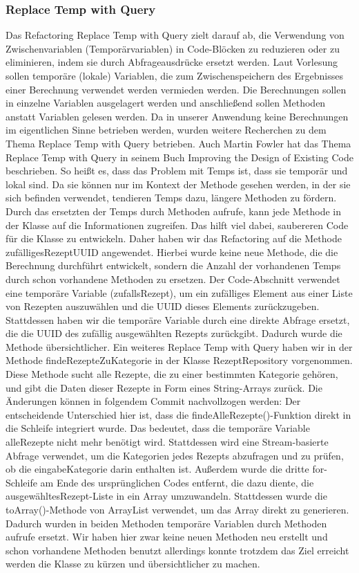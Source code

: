 \subsubsection{Replace Temp with Query}
Das Refactoring Replace Temp with Query zielt darauf ab, die Verwendung von Zwischenvariablen (Temporärvariablen) in Code-Blöcken zu reduzieren oder zu eliminieren, indem sie durch Abfrageausdrücke ersetzt werden. 
Laut Vorlesung sollen temporäre (lokale) Variablen, die zum Zwischenspeichern des Ergebnisses einer Berechnung verwendet werden vermieden werden. Die Berechnungen sollen in einzelne Variablen ausgelagert werden und anschließend sollen Methoden anstatt Variablen gelesen werden. 
Da in unserer Anwendung keine Berechnungen im eigentlichen Sinne betrieben werden, wurden weitere Recherchen zu dem Thema Replace Temp with Query betrieben. Auch Martin Fowler hat das Thema Replace Temp with Query in seinem Buch \glqq Improving the Design of Existing Code \grqq{} beschrieben. So heißt es, dass das Problem mit Temps ist, dass sie temporär und lokal sind. Da sie können nur im Kontext der Methode gesehen werden, in der sie sich befinden verwendet, tendieren Temps dazu, längere Methoden zu fördern.
Durch das ersetzten der Temps durch Methoden aufrufe, kann jede Methode in der Klasse auf die Informationen zugreifen. Das hilft
viel dabei, saubereren Code für die Klasse zu entwickeln.
Daher haben wir das Refactoring auf die Methode zufälligesRezeptUUID angewendet. Hierbei wurde keine neue Methode, die die Berechnung durchführt entwickelt, sondern die Anzahl der vorhandenen Temps durch schon vorhandene Methoden zu ersetzen. Der Code-Abschnitt verwendet eine temporäre Variable (zufallsRezept), um ein zufälliges Element aus einer Liste von Rezepten auszuwählen und die UUID dieses Elements zurückzugeben. Stattdessen haben wir die temporäre Variable durch eine direkte Abfrage ersetzt, die die UUID des zufällig ausgewählten Rezepts zurückgibt. Dadurch wurde die Methode übersichtlicher.
Ein weiteres Replace Temp with Query haben wir in der Methode findeRezepteZuKategorie in der Klasse RezeptRepository vorgenommen. Diese Methode sucht alle Rezepte, die zu einer bestimmten Kategorie gehören, und gibt die Daten dieser Rezepte in Form eines String-Arrays zurück. Die Änderungen können in folgendem Commit nachvollzogen werden: 
Der entscheidende Unterschied hier ist, dass die findeAlleRezepte()-Funktion direkt in die Schleife integriert wurde. Das bedeutet, dass die temporäre Variable alleRezepte nicht mehr benötigt wird. Stattdessen wird eine Stream-basierte Abfrage verwendet, um die Kategorien jedes Rezepts abzufragen und zu prüfen, ob die eingabeKategorie darin enthalten ist.
Außerdem wurde die dritte for-Schleife am Ende des ursprünglichen Codes entfernt, die dazu diente, die ausgewähltesRezept-Liste in ein Array umzuwandeln. Stattdessen wurde die toArray()-Methode von ArrayList verwendet, um das Array direkt zu generieren. 
Dadurch wurden in beiden Methoden temporäre Variablen durch Methoden aufrufe ersetzt. Wir haben hier zwar keine neuen Methoden neu erstellt und schon vorhandene Methoden benutzt allerdings konnte trotzdem das Ziel erreicht werden die Klasse zu kürzen und übersichtlicher zu machen.